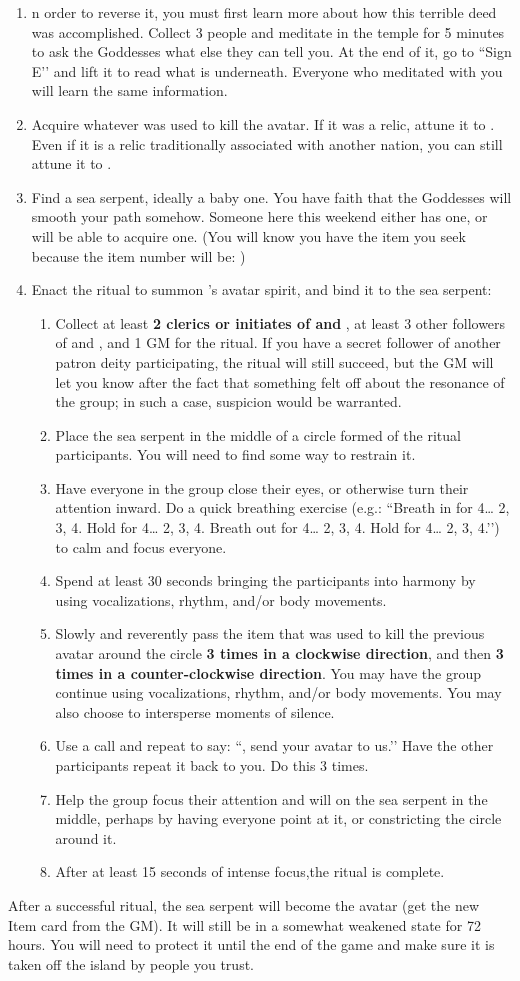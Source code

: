\documentclass[green]{GL2020}
\begin{document}
\begin{enumerate}
  \item n order to reverse it, you must first learn more about how this terrible deed was accomplished. Collect 3 people and meditate in the temple for 5 minutes to ask the Goddesses what else they can tell you. At the end of it, go to ``Sign E’’ and lift it to read what is underneath. Everyone who meditated with you will learn the same information.
  \item Acquire whatever was used to kill the \cEbb{} avatar. If it was a relic, attune it to \pShip{}. Even if it is a relic traditionally associated with another nation, you can still attune it to \pShip{}.
  \item Find a sea serpent, ideally a baby one. You have faith that the Goddesses will smooth your path somehow. Someone here this weekend either has one, or will be able to acquire one. (You will know you have the item you seek because the item number will be: \iBabySeaSerpent{\MYnumber})
  \item Enact the ritual to summon \cEbb{}’s avatar spirit, and bind it to the sea serpent:
  \begin{enumerate}
    \item Collect at least \textbf{2 clerics or initiates of \cEbb{} and \cFlow{}}, at least 3 other followers of \cEbb{} and \cFlow{}, and 1 GM for the ritual. If you have a secret follower of another patron deity participating, the ritual will still succeed, but the GM will let you know after the fact that something felt off about the resonance of the group; in such a case, suspicion would be warranted. 
    \item Place the sea serpent in the middle of a circle formed of the ritual participants. You will need to find some way to restrain it.
    \item Have everyone in the group close their eyes, or otherwise turn their attention inward. Do a quick breathing exercise (e.g.: ``Breath in for 4… 2, 3, 4. Hold for 4… 2, 3, 4. Breath out for 4… 2, 3, 4. Hold for 4… 2, 3, 4.’’) to calm and focus everyone.
    \item Spend at least 30 seconds bringing the participants into harmony by using vocalizations, rhythm, and/or body movements.
    \item Slowly and reverently pass the item that was used to kill the previous avatar around the circle \textbf{3 times in a clockwise direction}, and then \textbf{3 times in a counter-clockwise direction}. You may have the group continue using vocalizations, rhythm, and/or body movements. You may also choose to intersperse moments of silence.
    \item Use a call and repeat to say: ``\cEbb{\Full}, send your avatar to us.’’ Have the other participants repeat it back to you. Do this 3 times.
    \item Help the group focus their attention and will on the sea serpent in the middle, perhaps by having everyone point at it, or constricting the circle around it.
    \item After at least 15 seconds of intense focus,the ritual is complete.
  \end{enumerate}
\end{enumerate}

After a successful ritual, the sea serpent will become the \cEbb{} avatar (get the new Item card from the GM). It will still be in a somewhat weakened state for 72 hours. You will need to protect it until the end of the game and make sure it is taken off the island by people you trust.
\end{document}
